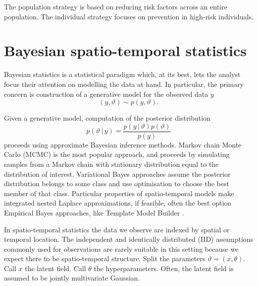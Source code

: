 \documentclass[a4paper, nobind]{templates/ociamthesis}
\begin{document}
The population strategy \autocite{rose2001sick} is based on reducing risk factors across an entire population.
The individual strategy focuses on prevention in high-risk individuals.

\hypertarget{bayesian-spatio-temporal-statistics}{%
\section{Bayesian spatio-temporal statistics}\label{bayesian-spatio-temporal-statistics}}

Bayesian statistics is a statistical paradigm which, at its best, lets the analyst focus their attention on modelling the data at hand.
In particular, the primary concern is construction of a generative model for the observed data \(y\)
\[
(y, \vartheta) \sim p(y, \vartheta).
\]

Given a generative model, computation of the posterior distribution
\[
p(\vartheta \, | \, y) = \frac{p(y \, | \, \vartheta) p(\vartheta)}{p(y)}
\]
proceeds using approximate Bayesian inference methods.
Markov chain Monte Carlo (MCMC) is the most popular approach, and proceeds by simulating samples from a Markov chain with stationary distribution equal to the distribution of interest.
Variational Bayes approaches assume the posterior distribution belongs to some class and use optimisation to choose the best member of that class.
Particular properties of spatio-temporal models make integrated nested Laplace approximations, if feasible, often the best option
Empirical Bayes approaches, like Template Model Builder \autocite{osgoodzimmerman2021statistical}.

In spatio-temporal statistics the data we observe are indexed by spatial or temporal location.
The independent and identically distributed (IID) assumptions commonly used for observations are rarely suitable in this setting because we expect there to be spatio-temporal structure.
Split the parameters \(\vartheta = (x, \theta)\).
Call \(x\) the latent field.
Call \(\theta\) the hyperparameters.
Often, the latent field is assumed to be jointly multivariate Gaussian.
\end{document}
